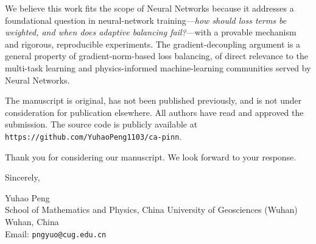 \documentclass[11pt]{article}
\begin{document}
We believe this work fits the scope of Neural Networks because it addresses a foundational question in neural-network training---\emph{how should loss terms be weighted, and when does adaptive balancing fail?}---with a provable mechanism and rigorous, reproducible experiments. The gradient-decoupling argument is a general property of gradient-norm-based loss balancing, of direct relevance to the multi-task learning and physics-informed machine-learning communities served by Neural Networks.

The manuscript is original, has not been published previously, and is not under consideration for publication elsewhere. All authors have read and approved the submission. The source code is publicly available at \texttt{https://github.com/YuhaoPeng1103/ca-pinn}.

Thank you for considering our manuscript. We look forward to your response.

\vspace{0.8cm}

Sincerely,

\vspace{0.4cm}

Yuhao Peng\\
School of Mathematics and Physics, China University of Geosciences (Wuhan)\\
Wuhan, China\\
Email: \texttt{pngyuo@cug.edu.cn}
\end{document}
